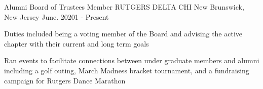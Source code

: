 \begin{cventries}
  \cventry
    {Alumni Board of Trustees Member}
    {RUTGERS DELTA CHI}
    {New Brunswick, New Jersey}
    {June. 20201 - Present}
    {
      \begin{cvitems}
        \item {Duties included being a voting member of the Board and advising the active chapter with their current and long term goals}
        \item {Ran events to facilitate connections between under graduate members and alumni including a golf outing, March Madness bracket tournament, and a fundraising campaign for Rutgers Dance Marathon }
      \end{cvitems}
    }
  \cventry
\end{cventries}